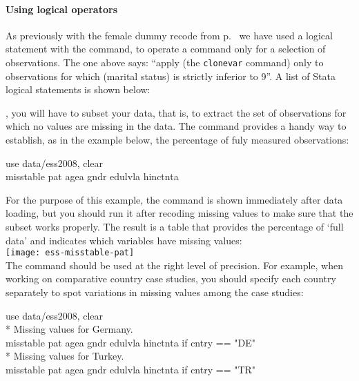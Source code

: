 \paragraph{Using logical operators} %
As previously with the female dummy recode from p.~\pageref{female-dummy} we have used a logical statement with the  command, to operate a command only for a selection of observations. The one above says: ``apply (the \texttt{clonevar} command) only to observations for which (marital status) is strictly inferior to 9''. A list of Stata logical statements is shown below:


	
, you will have to subset your data, that is, to extract the set of observations for which no values are missing in the data. The  command provides a handy way to establish, as in the \ESS example below, the percentage of fuly measured observations:

	\begin{docspec}
		use data/ess2008, clear\\
		misstable pat agea gndr edulvla hinctnta
	\end{docspec}
	
	For the purpose of this example, the  command is shown immediately after data loading, but you should run it after recoding missing values to make sure that the subset works properly. The result is a table that provides the percentage of `full data' and indicates which variables have missing values:\\[1em]
	
	\texttt{[image: ess-misstable-pat]}\\[1em]

	The  command should be used at the right level of precision. For example, when working on comparative country case studies, you should specify each country separately to spot variations in missing values among the case studies:\\[1em]
	
	\begin{docspec}
		use data/ess2008, clear\\[1em]%
		* Missing values for Germany.\\%
		misstable pat agea gndr edulvla hinctnta if cntry == "DE"\\[1em]%
		* Missing values for Turkey.\\%
		misstable pat agea gndr edulvla hinctnta if cntry == "TR"
	\end{docspec}


